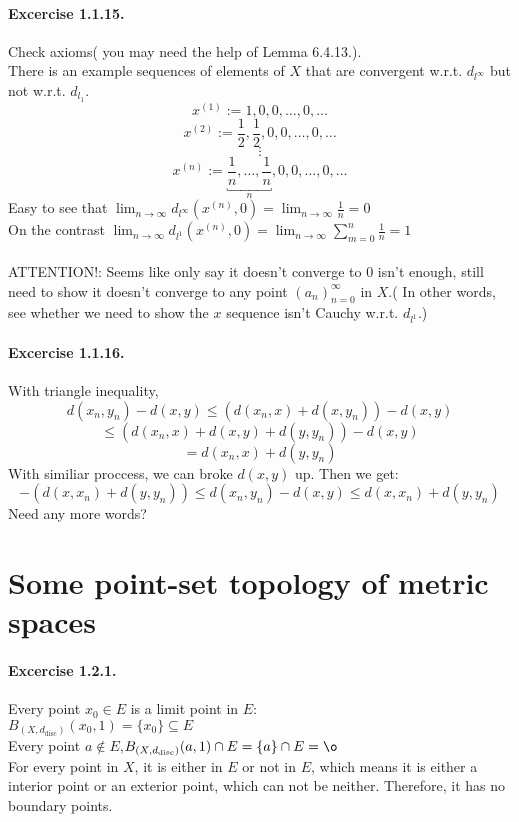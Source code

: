\paragraph{Excercise 1.1.15.}
Check axioms( you may need the help of Lemma 6.4.13.).\\
There is an example sequences of elements of $X$ that are convergent w.r.t. $d_{l^\infty}$ but not w.r.t. $d_{l_{1}}$.\[x^{(1)}:=1,0,0,\dots,0,\dots\]
\[x^{(2)}:=\frac{1}{2},\frac{1}{2},0,0,\dots,0,\dots\]
\[\vdots\]
\[x^{(n)}:=\underbracket{\frac{1}{n},\dots,\frac{1}{n}}_{n},0,0,\dots,0,\dots\]
Easy to see that $\lim_{n\rightarrow\infty}d_{l^{\infty}}(x^{(n)},0)=\lim_{n\rightarrow\infty}\frac{1}{n}=0$\\
On the contrast $\lim_{n\rightarrow\infty}d_{l^{1}}(x^{(n)},0)=\lim_{n\rightarrow\infty}\sum_{m=0}^{n}\frac{1}{n}=1$\\\\ATTENTION!: Seems like only say it doesn't converge to 0 isn't enough, still need to show it doesn't converge to any point $(a_{n})_{n=0}^{\infty}$ in $X$.( In other words, see whether we need to show the $x$ sequence isn't Cauchy w.r.t. $d_{l^{1}}$.)
\paragraph{Excercise 1.1.16.}
With triangle inequality,
\[d(x_{n},y_{n})-d(x,y)\leq (d(x_{n},x)+d(x,y_{n}))-d(x,y)\]
\[\leq(d(x_{n},x)+d(x,y)+d(y,y_{n}))-d(x,y)\]
\[=d(x_{n},x)+d(y,y_{n})\]
With similiar proccess, we can broke $d(x,y)$ up. Then we get:\\
\[-(d(x,x_{n})+d(y,y_{n}))\leq d(x_{n},y_{n})-d(x,y)\leq d(x,x_{n})+d(y,y_{n})\]
Need any more words?

\section{Some point-set topology of metric spaces}
\paragraph{Excercise 1.2.1.} Every point $x_{0}$$\in$$E$ is a limit point in $E$:\\
$B_{(X,d_{\text{disc}})}(x_{0},1)=\{x_{0}\}\subseteq E$\\
Every point $a \notin E$,$B_{(X,d_{\text{disc}})}(a,1) \cap E =\{a\} \cap E = \o$\\
For every point in $X$, it is either in $E$ or not in $E$, which means it is either a interior point or an exterior point, which can not be neither. Therefore, it has no boundary points.
